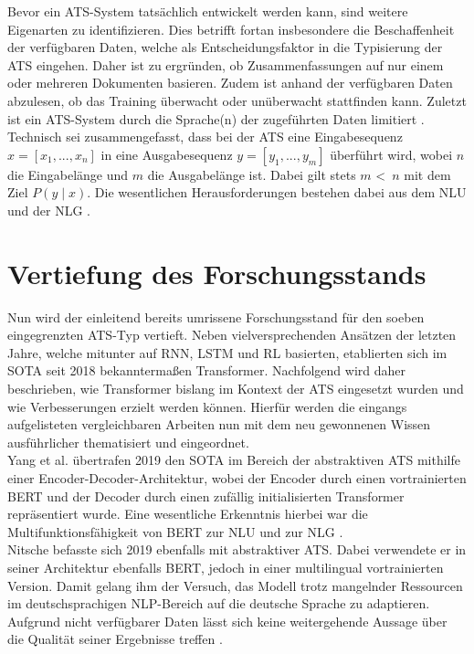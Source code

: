 \noindent
Bevor ein \ac{ATS}-System tatsächlich entwickelt werden kann, sind weitere Eigenarten zu identifizieren. Dies betrifft fortan insbesondere die Beschaffenheit der verfügbaren Daten, welche als Entscheidungsfaktor in die Typisierung der \ac{ATS} eingehen. Daher ist zu ergründen, ob Zusammenfassungen auf nur einem oder mehreren Dokumenten basieren. Zudem ist anhand der verfügbaren Daten abzulesen, ob das Training überwacht oder unüberwacht stattfinden kann. Zuletzt ist ein \ac{ATS}-System durch die Sprache(n) der zugeführten Daten limitiert \cite[S.~5]{GAM16}.\\

\noindent
Technisch sei zusammengefasst, dass bei der \ac{ATS} eine Eingabesequenz $x = [x_{1}, ..., x_{n}]$ in eine Ausgabesequenz $y = [y_{1}, ..., y_{m}]$ überführt wird, wobei $n$ die Eingabelänge und $m$ die Ausgabelänge ist. Dabei gilt stets $m$ \textless \, $n$ mit dem Ziel $P(y \mid x)$. Die wesentlichen Herausforderungen bestehen dabei aus dem \ac{NLU} und der \ac{NLG} \cite[S.~32-33]{NIT19}.


\section{Vertiefung des Forschungsstands}
\noindent
Nun wird der einleitend bereits umrissene Forschungsstand für den soeben eingegrenzten \ac{ATS}-Typ vertieft. Neben vielversprechenden Ansätzen der letzten Jahre, welche mitunter auf \ac{RNN}, \ac{LSTM} und \ac{RL} basierten, etablierten sich im \ac{SOTA} seit 2018 bekanntermaßen Transformer. Nachfolgend wird daher beschrieben, wie Transformer bislang im Kontext der \ac{ATS} eingesetzt wurden und wie Verbesserungen erzielt werden können. Hierfür werden die eingangs aufgelisteten vergleichbaren Arbeiten nun mit dem neu gewonnenen Wissen ausführlicher thematisiert und eingeordnet.\\

\noindent
Yang et al. übertrafen 2019 den \ac{SOTA} im Bereich der abstraktiven \ac{ATS} mithilfe einer Encoder-Decoder-Architektur, wobei der Encoder durch einen vortrainierten \ac{BERT} und der Decoder durch einen zufällig initialisierten Transformer repräsentiert wurde. Eine wesentliche Erkenntnis hierbei war die Multifunktionsfähigkeit von \ac{BERT} zur \ac{NLU} und zur \ac{NLG} \cite{YAN19}.\\

\noindent
Nitsche befasste sich 2019 ebenfalls mit abstraktiver \ac{ATS}. Dabei verwendete er in seiner Architektur ebenfalls \ac{BERT}, jedoch in einer multilingual vortrainierten Version. Damit gelang ihm der Versuch, das Modell trotz mangelnder Ressourcen im deutschsprachigen \ac{NLP}-Bereich auf die deutsche Sprache zu adaptieren. Aufgrund nicht verfügbarer Daten lässt sich keine weitergehende Aussage über die Qualität seiner Ergebnisse treffen \cite{NIT19}.
\newpage

